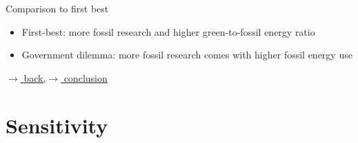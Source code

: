 \documentclass[11pt,aspectratio=169]{beamer}
\begin{document}
\begin{frame}{Comparison to first best}
\begin{figure}
\begin{subfigure}{0.45\textwidth}
	\end{subfigure}
\end{figure}
\vspace{1mm}
\begin{block}{}
	\begin{itemize}
		\item First-best: more fossil research and higher green-to-fossil energy ratio
		\item \alert{Government dilemma:  more fossil research comes with higher fossil energy use}
	\end{itemize}
\end{block}	

\vspace{-5.5mm}
\hfill	\hyperlink{mec}{\tiny{$\rightarrow$ back,}}\hyperlink{conc}{\tiny{$\rightarrow$ conclusion}}
\end{frame}

\section*{Sensitivity}
\end{document}
